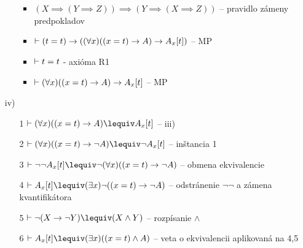 \begin{dokaz}
\begin{itemize}
\begin{itemize}
\begin{itemize}
                \item $(X \implies (Y \implies Z)) \implies
                       (Y \implies (X \implies Z))$ -- pravidlo zámeny
                       predpokladov

                \item $\vdash (t=t) \rightarrow ((\forall x) ((x=t)
                    \rightarrow A) \rightarrow A_x[t])$ -- MP

                \item $\vdash t=t$ - axióma R1

                \item $\vdash (\forall x) ((x=t)
                    \rightarrow A) \rightarrow A_x[t]$ -- MP
                \end{itemize}
            \end{itemize}
        \item[iv)]
            \begin{itemize}
            \item[1] $\provable (\forall x)((x=t) \implies A)
                \lequiv A_x[t]$ -- iii)
            \item[2] $\provable (\forall x)((x=t) \implies \neg A)
                \lequiv \neg A_x[t]$ -- inštancia 1
            \item[3] $\provable \neg \neg A_x[t] \lequiv
                \neg (\forall x) ((x=t) \implies \neg A)$ -- obmena
                ekvivalencie
            \item[4] $\provable A_x[t] \lequiv (\exists x) \neg
                ((x=t) \implies \neg A)$ -- odstránenie $\neg \neg$ a
                zámena kvantifikátora
            \item[5] $\provable \neg(X \implies \neg Y)
                \lequiv  (X \land Y)$ -- rozpísanie
                $\land$
            \item[6] $\provable A_x[t] \lequiv (\exists x)
                ((x=t) \land A)$ -- veta o ekvivalencii aplikovaná na
                4,5

            \end{itemize}
    \end{itemize}
\end{dokaz}

